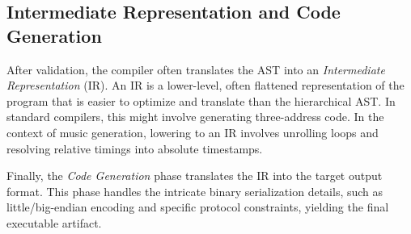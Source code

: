 \subsection{Intermediate Representation and Code
Generation}\label{subsec:intermediate-representation-and-code-generation}

After validation, the compiler often translates the AST into an \textit{Intermediate Representation} (IR).
An IR is a lower-level, often flattened representation of the program that is easier to optimize and translate than the
hierarchical AST\@.
In standard compilers, this might involve generating three-address code.
In the context of music generation, lowering to an IR involves unrolling loops and resolving relative timings into
absolute timestamps.

Finally, the \textit{Code Generation} phase translates the IR into the target output format.
This phase handles the intricate binary serialization details, such as little/big-endian encoding and specific protocol
constraints, yielding the final executable artifact.
